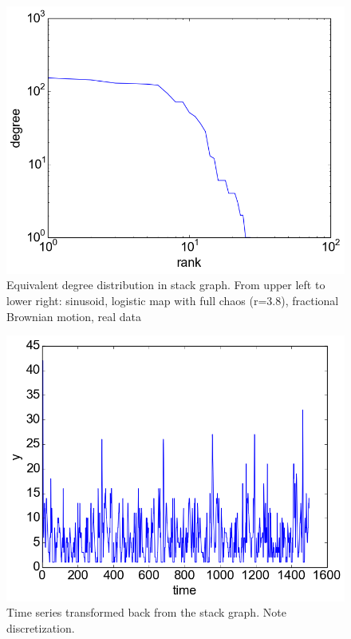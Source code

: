 \documentclass[12pt]{article}
\begin{document}
\begin{figure}
    \includegraphics[scale=0.4]{degrees_vr}
  \caption{Equivalent degree distribution in stack graph. From upper left to lower right: sinusoid, logistic map with full chaos (r=3.8), fractional Brownian motion, real data}
  \label{fig:stack_ts_degree}
\end{figure}

\begin{figure}
  \centering
  \includegraphics[scale=0.6]{resampled_stack}
  \caption{Time series transformed back from the stack graph. Note discretization.}
  \label{fig:resampled_stack}
\end{figure}
\end{document}
